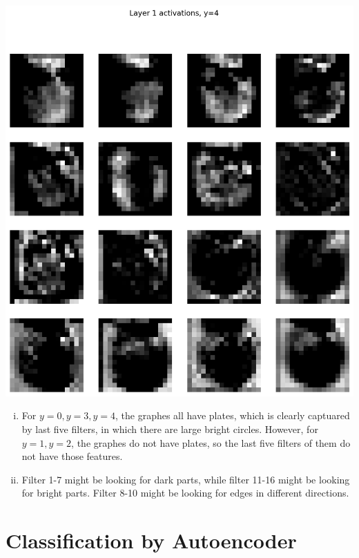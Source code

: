 \documentclass[11pt, answers]{exam}
\begin{document}
\begin{solution}
\begin{parts}
\begin{center}
      \includegraphics[scale=0.6]{CNN_viz1_4.png}
    \end{center}

    \begin{enumerate}[i.]
      \item For $y = 0, y = 3, y = 4$, the graphes all have plates, which is clearly captuared by last five filters, in which there are large bright circles. However, for $y = 1, y = 2$, the graphes do not have plates, so the last five filters of them do not have those features.

      \item Filter 1-7 might be looking for dark parts, while filter 11-16 might be looking for bright parts. Filter 8-10 might be looking for edges in different directions.
    \end{enumerate}



  \end{parts}
  \end{solution}

  \section{Classiﬁcation by Autoencoder}%
  \label{sec:classification_by_autoencoder}
\end{document}
